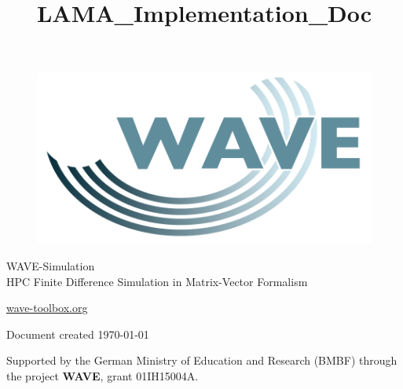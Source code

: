 \documentclass[pdftex,a4paper,parskip,listof=totoc,bibliography=totoc,onehalfspacing,12pt]{scrreprt}
\title{LAMA_Implementation_Doc}
\author{}
\begin{document}


\thispagestyle{empty} %
\begin{figure}[h] %
\begin{flushright}
\includegraphics[scale=0.15]{./images/wave_logo.png}
\end{flushright}
\end{figure}

\begin{center}
\vspace{2cm}
\huge{WAVE-Simulation }\\
\vspace{0.5cm}
\large{HPC Finite Difference Simulation in Matrix-Vector Formalism}
\end{center}

\vfill
\begin{center}
{\Large{\url{wave-toolbox.org}}}

{\small Document created \today}
\end{center}

\newpage 
\thispagestyle{empty}
\begin{center}
{\large
Supported by the German Ministry of Education and Research (BMBF) through the project \textbf{WAVE}, grant 01IH15004A.
}
\end{center}

\cleardoublepage

\setcounter{page}{1}
\restoregeometry

\newpage

\tableofcontents %
\end{document}
